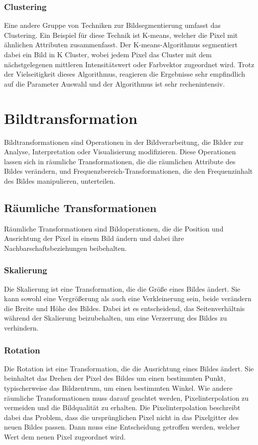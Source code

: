 \subsubsection{Clustering}
Eine andere Gruppe von Techniken zur Bildsegmentierung umfasst das Clustering. Ein Beispiel für diese Technik ist K-means, 
welcher die Pixel mit ähnlichen Attributen zusammenfasst. Der K-means-Algorithmus segmentiert dabei ein Bild in K Cluster, 
wobei jedem Pixel das Cluster mit dem nächstgelegenen mittleren Intensitätswert oder Farbvektor zugeordnet wird. 
Trotz der Vielseitigkeit dieses Algorithmus, reagieren die Ergebnisse sehr empfindlich auf die Parameter Auswahl und der Algorithmus ist
sehr rechenintensiv.~\cite{G.B._Coleman_1979_ieee}

\section{Bildtransformation}
Bildtransformationen sind Operationen in der Bildverarbeitung, die Bilder zur Analyse, Interpretation oder Visualisierung modifizieren. 
Diese Operationen lassen sich in räumliche Transformationen, die die räumlichen Attribute des Bildes verändern, 
und Frequenzbereich-Transformationen, die den Frequenzinhalt des Bildes manipulieren, unterteilen.

\subsection{Räumliche Transformationen}
Räumliche Transformationen sind Bildoperationen, die die Position und Ausrichtung der Pixel in einem Bild ändern 
und dabei ihre Nachbarschaftsbeziehungen beibehalten.

\subsubsection{Skalierung}
Die Skalierung ist eine Transformation, die die Größe eines Bildes ändert. Sie kann sowohl eine Vergrößerung als auch eine Verkleinerung sein, 
beide verändern die Breite und Höhe des Bildes. Dabei ist es entscheidend, das Seitenverhältnis während der Skalierung beizubehalten, 
um eine Verzerrung des Bildes zu verhindern.

\subsubsection{Rotation}
Die Rotation ist eine Transformation, die die Ausrichtung eines Bildes ändert. 
Sie beinhaltet das Drehen der Pixel des Bildes um einen bestimmten Punkt, typischerweise das Bildzentrum, um einen bestimmten Winkel. 
Wie andere räumliche Transformationen muss darauf geachtet werden, Pixelinterpolation zu vermeiden und die Bildqualität zu erhalten.
Die Pixelinterpolation beschreibt dabei das Problem, dass die ursprünglichen Pixel nicht in das Pixelgitter des neuen Bildes passen.
Dann muss eine Entscheidung getroffen werden, welcher Wert dem neuen Pixel zugeordnet wird.~\cite{Don_Lancaster_2007_ollintec}

